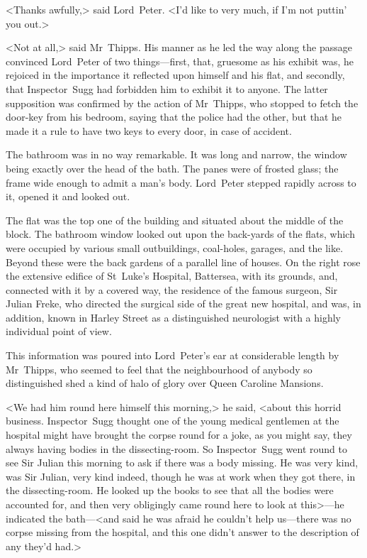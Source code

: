 <Thanks awfully,> said Lord~Peter. <I'd like to very much, if I'm not puttin' you out.>

<Not at all,> said Mr~Thipps. His manner as he led the way along the passage convinced Lord~Peter of two things—first, that, gruesome as his exhibit was, he rejoiced in the importance it reflected upon himself and his flat, and secondly, that Inspector~Sugg had forbidden him to exhibit it to anyone. The latter supposition was confirmed by the action of Mr~Thipps, who stopped to fetch the door-key from his bedroom, saying that the police had the other, but that he made it a rule to have two keys to every door, in case of accident.

The bathroom was in no way remarkable. It was long and narrow, the window being exactly over the head of the bath. The panes were of frosted glass; the frame wide enough to admit a man's body. Lord~Peter stepped rapidly across to it, opened it and looked out.

The flat was the top one of the building and situated about the middle of the block. The bathroom window looked out upon the back-yards of the flats, which were occupied by various small outbuildings, coal-holes, garages, and the like. Beyond these were the back gardens of a parallel line of houses. On the right rose the extensive edifice of St~Luke's Hospital, Battersea, with its grounds, and, connected with it by a covered way, the residence of the famous surgeon, Sir Julian Freke, who directed the surgical side of the great new hospital, and was, in addition, known in Harley Street as a distinguished neurologist with a highly individual point of view.

This information was poured into Lord~Peter's ear at considerable length by Mr~Thipps, who seemed to feel that the neighbourhood of anybody so distinguished shed a kind of halo of glory over Queen Caroline Mansions.

<We had him round here himself this morning,> he said, <about this horrid business. Inspector~Sugg thought one of the young medical gentlemen at the hospital might have brought the corpse round for a joke, as you might say, they always having bodies in the dissecting-room. So Inspector~Sugg went round to see Sir Julian this morning to ask if there was a body missing. He was very kind, was Sir Julian, very kind indeed, though he was at work when they got there, in the dissecting-room. He looked up the books to see that all the bodies were accounted for, and then very obligingly came round here to look at this>—he indicated the bath—<and said he was afraid he couldn't help us—there was no corpse missing from the hospital, and this one didn't answer to the description of any they'd had.>

